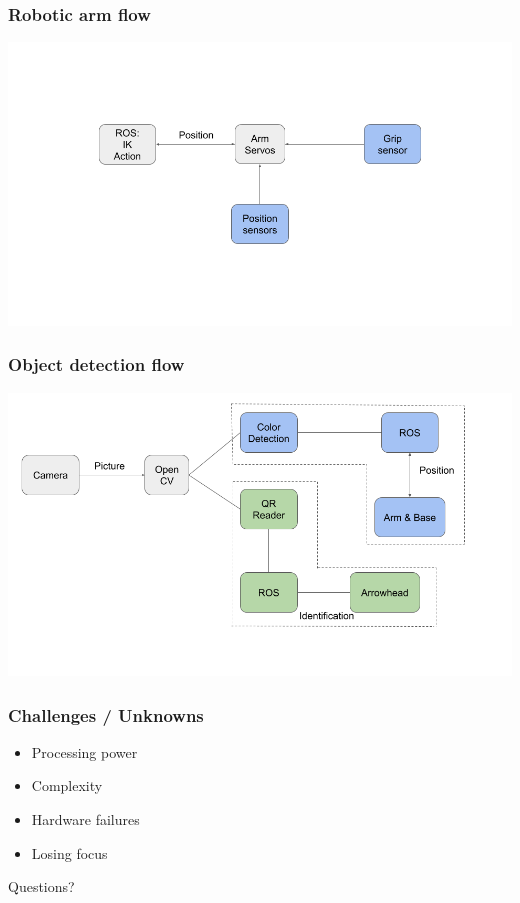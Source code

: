 \documentclass{beamer}
\begin{document}
\begin{frame}
    \frametitle{Robotic arm flow}
    \includegraphics[width=\textwidth]{img/arm_flow.png}
\end{frame}

\begin{frame}
    \frametitle{Object detection flow}
    \includegraphics[width=\textwidth]{img/vision_flow.png}
\end{frame}


\begin{frame}
    \frametitle{Challenges / Unknowns}
    \begin{itemize}
        \item Processing power
        \item Complexity
        \item Hardware failures
        \item Losing focus 
    \end{itemize}
\end{frame}

\begin{frame}
    \begin{center}
        \Huge Questions?
    \end{center}
\end{frame}
\end{document}

